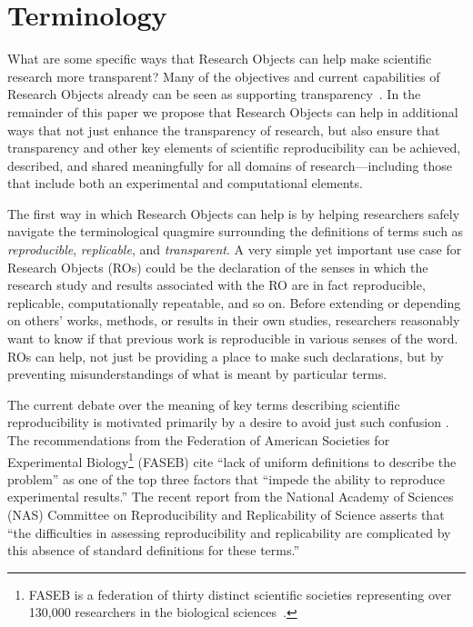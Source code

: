\section{Terminology}\label{sec-terminology}

What are some specific ways that Research Objects \cite{bechhofer2013whya} can help
	make scientific research more transparent?
Many of the objectives and current capabilities of Research Objects already can be seen as supporting
	transparency~\cite{mecum2018preservingc}.
In the remainder of this paper we propose that Research Objects can help in additional ways that not
	just enhance the transparency of research, but also ensure that transparency and other key elements
	of scientific reproducibility can be achieved, described, and shared meaningfully for all domains
	of research---including those that include both an experimental and computational elements.

The first way in which Research Objects can help is by helping researchers safely navigate the
	terminological quagmire surrounding the definitions of terms such as \emph{reproducible},
	\emph{replicable}, and \emph{transparent}.
A very simple yet important use case for Research Objects (ROs) could be the declaration of the senses in
	which the research study and results associated with the RO are in fact reproducible, replicable,
	computationally repeatable, and so on.
Before extending or depending on others' works, methods, or results in their own studies, researchers
	reasonably want to know if that previous work is reproducible in various senses of the word.
ROs can help, not just be providing a place to make such declarations, but by preventing
	misunderstandings of what is meant by particular terms.

The current debate over the meaning of key terms describing
	scientific reproducibility is motivated primarily by a desire to avoid just such confusion \cite{drummond2009replicability,goodman2016what,rauber16primad,herouxtoward,plesser2018reproducibility,barba2018terminologies,committeeonreproducibilityandreplicabilityinscience2019reproducibility}.
The recommendations from the Federation of
	American Societies for Experimental Biology\footnote{FASEB is a federation of thirty distinct
    scientific societies representing over 130,000 researchers in the biological sciences~\cite{faseb_home}.}
	(FASEB)
	\cite{FASEB2016enhancing} cite ``lack of uniform definitions to describe the problem''
	as one of the top three factors that ``impede the ability to reproduce experimental results.''
 The recent report from the National Academy of Sciences (NAS) Committee on Reproducibility and Replicability of Science \cite{committeeonreproducibilityandreplicabilityinscience2019reproducibility} asserts
	that ``the difficulties in assessing reproducibility and replicability are complicated by this absence of
	standard definitions for these terms.''

